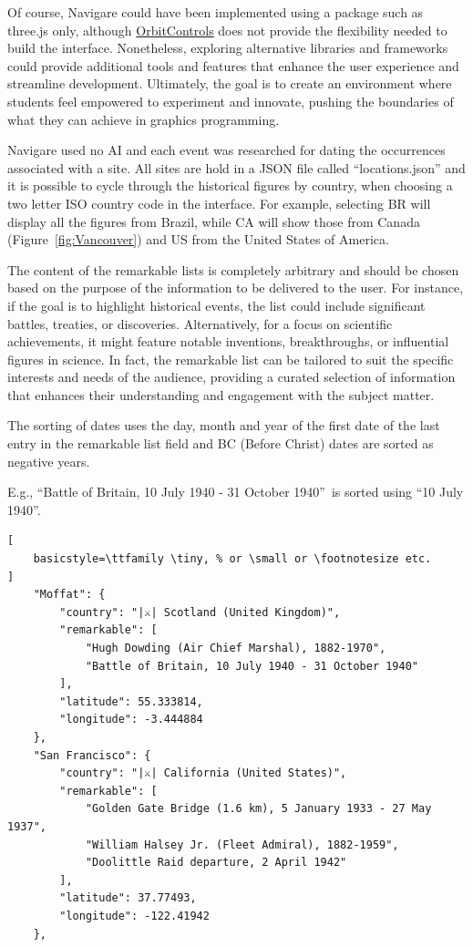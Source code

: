 \documentclass[conference]{IEEEtran}
\begin{document}
Of course, Navigare could have been implemented using a package such as three.js only,
although \href{https://threejs.org/docs/#OrbitControls}{OrbitControls} does not provide the flexibility needed to build the interface.
Nonetheless, exploring alternative libraries and frameworks could provide additional tools and features
that enhance the user experience and streamline development.
Ultimately, the goal is to create an environment where students feel empowered to experiment and innovate,
pushing the boundaries of what they can achieve in graphics programming.

Navigare used no AI and each event was researched for dating the occurrences associated with a site.
All sites are hold in a JSON file called ``locations.json'' and it is possible to cycle through the historical figures by country,
when choosing a two letter ISO country code in the interface.
For example, selecting BR will display all the figures from Brazil,
while CA will show those from Canada (Figure~\ref{fig:Vancouver}) and US from the United States of America.

The content of the remarkable lists is completely arbitrary and should be chosen based on the purpose of
the information to be delivered to the user. For instance, if the goal is to highlight historical events, the list
could include significant battles, treaties, or discoveries. Alternatively, for a focus on scientific achievements,
it might feature notable inventions, breakthroughs, or influential figures in science.
In fact, the remarkable list can be tailored to suit the specific interests and needs of the audience,
providing a curated selection of information that enhances their understanding and engagement with the subject matter.

The sorting of dates uses the day, month and year of the first date of the last entry in the remarkable list field
and BC (Before Christ) dates are sorted as negative years.

\vspace{0.5cm}
\noindent E.g., ``Battle of Britain, 10 July 1940 - 31 October 1940''\ is sorted using ``10 July 1940''.

\begin{lstlisting}[
    basicstyle=\ttfamily \tiny, % or \small or \footnotesize etc.
]
    "Moffat": {
        "country": "|⚔| Scotland (United Kingdom)",
        "remarkable": [
            "Hugh Dowding (Air Chief Marshal), 1882-1970",
            "Battle of Britain, 10 July 1940 - 31 October 1940"
        ],
        "latitude": 55.333814,
        "longitude": -3.444884
    },
    "San Francisco": {
        "country": "|⚔| California (United States)",
        "remarkable": [
            "Golden Gate Bridge (1.6 km), 5 January 1933 - 27 May 1937",
            "William Halsey Jr. (Fleet Admiral), 1882-1959",
            "Doolittle Raid departure, 2 April 1942"
        ],
        "latitude": 37.77493,
        "longitude": -122.41942
    },
\end{lstlisting}
\end{document}
